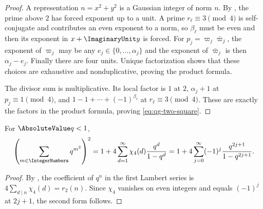 \begin{proof}
A representation $n=x^2+y^2$ is a Gaussian integer of norm $n$.  By
, the prime above $2$ has forced exponent up to a
unit.  A prime $r_\ell\equiv3\pmod4$ is self-conjugate and contributes an
even exponent to a norm, so $\beta_\ell$ must be even and then its exponent
in $x+\ImaginaryUnit y$ is forced.  For
$p_j=\varpi_j\bar\varpi_j$, the exponent of $\varpi_j$ may be any
$e_j\in\{0,\ldots,\alpha_j\}$ and the exponent of $\bar\varpi_j$ is then
$\alpha_j-e_j$.  Finally there are four units.  Unique factorization shows
that these choices are exhaustive and nonduplicative, proving the product
formula.

The divisor sum is multiplicative.  Its local factor is $1$ at $2$,
$\alpha_j+1$ at $p_j\equiv1\pmod4$, and
$1-1+\cdots+(-1)^{\beta_\ell}$ at $r_\ell\equiv3\pmod4$.  These are exactly
the factors in the product formula, proving \eqref{eq:qg-two-square}.
\end{proof}

\begin{corollary}
\label{qg:cor-two-square-lambert}
For $\AbsoluteValue q<1$,
\begin{equation}
 \left(\sum_{m\in\IntegerNumbers}q^{m^2}\right)^2
 =1+4\sum_{d=1}^{\infty}\chi_4(d)\frac{q^d}{1-q^d}
 =1+4\sum_{j=0}^{\infty}(-1)^j
       \frac{q^{2j+1}}{1-q^{2j+1}}.
\label{eq:qg-two-square-lambert}
\end{equation}
\end{corollary}

\begin{proof}
By , the coefficient of $q^n$
in the first Lambert series is $4\sum_{d\mid n}\chi_4(d)=r_2(n)$.
Since $\chi_4$ vanishes on even integers and equals $(-1)^j$ at $2j+1$,
the second form follows.
\end{proof}

